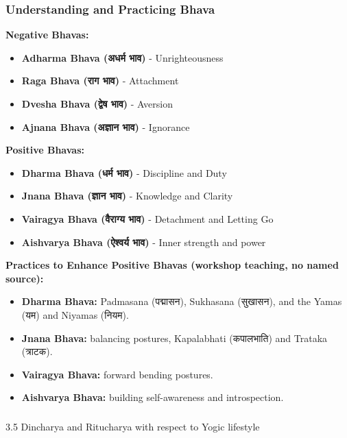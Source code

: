 \begin{frame}[fragile,shrink=6]\frametitle{Understanding and Practicing Bhava}
    \textbf{Negative Bhavas:}
    \begin{itemize}
        \item \textbf{Adharma Bhava (अधर्म भाव)} - Unrighteousness
        \item \textbf{Raga Bhava (राग भाव)} - Attachment
        \item \textbf{Dvesha Bhava (द्वेष भाव)} - Aversion
        \item \textbf{Ajnana Bhava (अज्ञान भाव)} - Ignorance
    \end{itemize}
    
    \textbf{Positive Bhavas:}
    \begin{itemize}
        \item \textbf{Dharma Bhava (धर्म भाव)} - Discipline and Duty
        \item \textbf{Jnana Bhava (ज्ञान भाव)} - Knowledge and Clarity
        \item \textbf{Vairagya Bhava (वैराग्य भाव)} - Detachment and Letting Go
        \item \textbf{Aishvarya Bhava (ऐश्वर्य भाव)} - Inner strength and power
    \end{itemize}

    \textbf{Practices to Enhance Positive Bhavas (workshop teaching, no named source):}
    \begin{itemize}
        \item \textbf{Dharma Bhava:} Padmasana (पद्मासन), Sukhasana (सुखासन), and the Yamas (यम) and Niyamas (नियम).
        \item \textbf{Jnana Bhava:} balancing postures, Kapalabhati (कपालभाति) and Trataka (त्राटक).
        \item \textbf{Vairagya Bhava:} forward bending postures.
        \item \textbf{Aishvarya Bhava:} building self-awareness and introspection.
    \end{itemize}
\end{frame}


\begin{frame}[fragile]\frametitle{}
\begin{center}
{\Large 3.5 Dincharya and Ritucharya with respect to Yogic lifestyle}
\end{center}
\end{frame}

